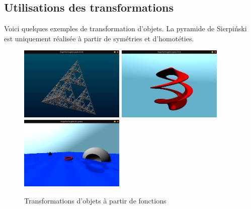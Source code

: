 \subsection{Utilisations des transformations}
Voici quelques exemples de transformation d'objets. La pyramide de Sierpiński est uniquement réalisée à partir de symétries et d'homotéties.
\begin{figure}[h]
    \centering
    \includegraphics[width=5cm]{images/screens/sierp.png}
    \includegraphics[width=5cm]{images/screens/modifier1.png}
    \includegraphics[width=5cm]{images/screens/modifier2.png}
    \caption{Transformations d'objets à partir de fonctions}
    \label{fig:ocean}
\end{figure}